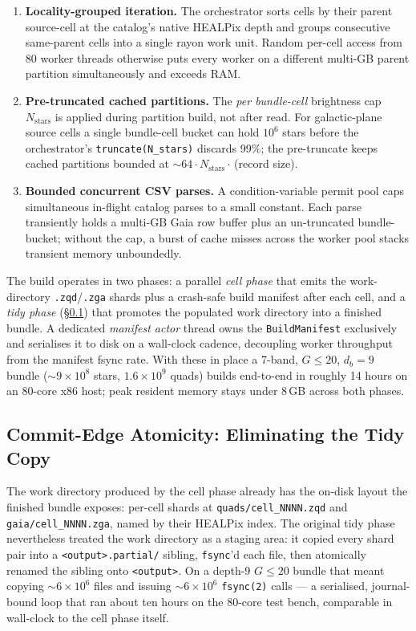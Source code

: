 \documentclass[twocolumn, 10pt]{article}
\begin{document}
\begin{enumerate}
  \item \textbf{Locality-grouped iteration.} The orchestrator sorts
    cells by their parent source-cell at the catalog's native
    HEALPix depth and groups consecutive same-parent cells into a
    single rayon work unit. Random per-cell access from 80 worker
    threads otherwise puts every worker on a different multi-GB
    parent partition simultaneously and exceeds RAM.
  \item \textbf{Pre-truncated cached partitions.} The \emph{per
    bundle-cell} brightness cap $N_\text{stars}$ is applied during
    partition build, not after read. For galactic-plane source
    cells a single bundle-cell bucket can hold $10^6$ stars before
    the orchestrator's \texttt{truncate(N\_stars)} discards 99\%; the
    pre-truncate keeps cached partitions bounded at $\sim 64 \cdot
    N_\text{stars} \cdot$\,(record size).
  \item \textbf{Bounded concurrent CSV parses.} A condition-variable
    permit pool caps simultaneous in-flight catalog parses to a
    small constant. Each parse transiently holds a multi-GB Gaia
    row buffer plus an un-truncated bundle-bucket; without the cap, a
    burst of cache misses across the worker pool stacks transient
    memory unboundedly.
\end{enumerate}

The build operates in two phases: a parallel \emph{cell phase} that
emits the work-directory \texttt{.zqd}/\texttt{.zga} shards plus a
crash-safe build manifest after each cell, and a \emph{tidy phase}
(§\ref{sec:tidy-rename}) that promotes the populated work directory
into a finished bundle. A dedicated \emph{manifest actor} thread
owns the \texttt{BuildManifest} exclusively and serialises it to disk
on a wall-clock cadence, decoupling worker throughput from the
manifest fsync rate. With these in place a 7-band, $G \le 20$,
$d_b{=}9$ bundle ($\sim 9 \times 10^8$ stars, $1.6 \times 10^9$
quads) builds end-to-end in roughly 14 hours on an 80-core x86 host;
peak resident memory stays under 8\,GB across both phases.

\subsection{Commit-Edge Atomicity: Eliminating the Tidy Copy}
\label{sec:tidy-rename}

The work directory produced by the cell phase already has the on-disk
layout the finished bundle exposes: per-cell shards at
\texttt{quads/cell\_NNNN.zqd} and \texttt{gaia/cell\_NNNN.zga}, named
by their HEALPix index. The original tidy phase nevertheless treated
the work directory as a staging area: it copied every shard pair into
a \texttt{<output>.partial/} sibling, \texttt{fsync}'d each file, then
atomically renamed the sibling onto \texttt{<output>}. On a depth-9
$G \le 20$ bundle that meant copying ${\sim}6 \times 10^{6}$ files
and issuing ${\sim}6 \times 10^{6}$ \texttt{fsync(2)} calls --- a
serialised, journal-bound loop that ran about ten hours on the
80-core test bench, comparable in wall-clock to the cell phase itself.
\end{document}

